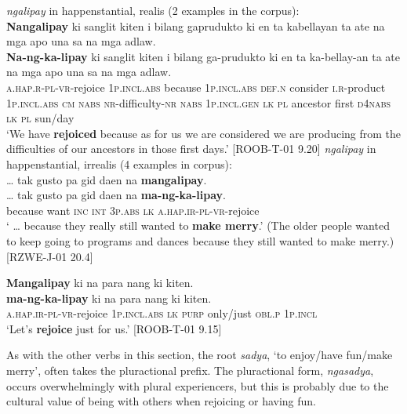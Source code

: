 \ea
\textit{ngalipay} in happenstantial, realis (2 examples in the corpus): \\ 
\textbf{Nangalipay}   ki  sanglit  kiten  i bilang  gaprudukto ki  en  ta  kabellayan  ta  ate  na  mga  apo  una  sa  na  mga  adlaw. \\\smallskip
\gll \textbf{Na-ng-ka-lipay}   ki  sanglit  kiten  i bilang  ga-prudukto ki  en  ta  ka-bellay-an  ta  ate  na  mga  apo  una  sa  na  mga  adlaw. \\
\textsc{a.hap.r-pl-vr}-rejoice  1\textsc{p.incl.abs}  because  1\textsc{p.incl.abs}  \textsc{def.n}
consider  \textsc{i.r}-product
1\textsc{p.incl.abs}  \textsc{cm}  \textsc{nabs}  \textsc{nr}-difficulty-\textsc{nr}  \textsc{nabs}  1\textsc{p.incl.gen}  \textsc{lk}  \textsc{pl}  ancestor first  \textsc{d4nabs}  \textsc{lk}  \textsc{pl} sun/day \\
\glt `We have \textbf{rejoiced} because as for us we are considered we are producing from the difficulties of our ancestors in those first days.’ [ROOB-T-01 9.20]
\z
\ea
\textit{ngalipay} in happenstantial, irrealis (4 examples in corpus): \\
 … tak  gusto  pa  gid  daen  na  \textbf{mangalipay}. \\\smallskip
\gll  … tak  gusto  pa  gid  daen  na  \textbf{ma-ng-ka-lipay}. \\
{} because  want  \textsc{inc}  \textsc{int}  3\textsc{p.abs}  \textsc{lk}  \textsc{a.hap.ir-pl-vr}-rejoice \\
\glt ‘ … because they really still wanted to \textbf{make merry}.’ (The older people wanted to keep going to programs and dances because they still wanted to make merry.) [RZWE-J-01 20.4]
\z

\ea
\textbf{Mangalipay}  ki  na  para  nang  ki  kiten. \\\smallskip
\gll \textbf{ma-ng-ka-lipay}  ki  na  para  nang  ki  kiten. \\
\textsc{a.hap.ir-pl-vr}-rejoice  1\textsc{p.incl.abs}  \textsc{lk}  \textsc{purp}  only/just  \textsc{obl.p}  1\textsc{p.incl} \\
\glt ‘Let’s \textbf{rejoice} just for us.’  [ROOB-T-01 9.15]
\z

As with the other verbs in this section, the root \textit{sadya}, ‘to enjoy/have fun/make merry’, often takes the pluractional prefix. The pluractional form, \textit{ngasadya}, occurs overwhelmingly with plural experiencers, but this is probably due to the cultural value of being with others when rejoicing or having fun.

